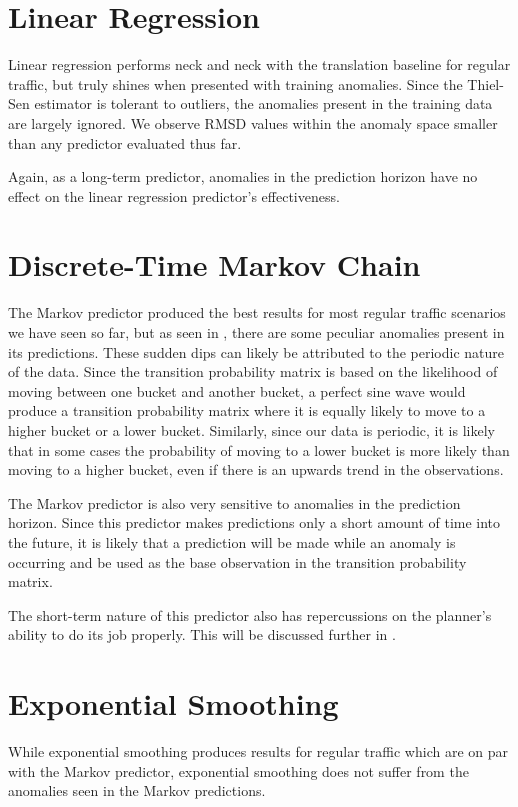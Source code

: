

\section{Linear Regression}
Linear regression performs neck and neck with the translation baseline for regular traffic, but truly shines when presented with training anomalies. Since the Thiel-Sen estimator is tolerant to outliers, the anomalies present in the training data are largely ignored. We observe RMSD values within the anomaly space smaller than any predictor evaluated thus far.

Again, as a long-term predictor, anomalies in the prediction horizon have no effect on the linear regression predictor's effectiveness.



\section{Discrete-Time Markov Chain}
The Markov predictor produced the best results for most regular traffic scenarios we have seen so far, but as seen in , there are some peculiar anomalies present in its predictions. These sudden dips can likely be attributed to the periodic nature of the data. Since the transition probability matrix is based on the likelihood of moving between one bucket and another bucket, a perfect sine wave would produce a transition probability matrix where it is equally likely to move to a higher bucket or a lower bucket. Similarly, since our data is periodic, it is likely that in some cases the probability of moving to a lower bucket is more likely than moving to a higher bucket, even if there is an upwards trend in the observations.

The Markov predictor is also very sensitive to anomalies in the prediction horizon. Since this predictor makes predictions only a short amount of time into the future, it is likely that a prediction will be made while an anomaly is occurring and be used as the base observation in the transition probability matrix.

The short-term nature of this predictor also has repercussions on the \textsf{planner's} ability to do its job properly. This will be discussed further in .



\section{Exponential Smoothing}
While exponential smoothing produces results for regular traffic which are on par with the Markov predictor, exponential smoothing does not suffer from the anomalies seen in the Markov predictions.

